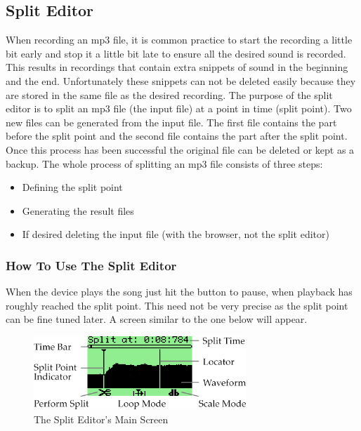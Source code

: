 \subsection{Split Editor}

When recording an mp3 file, it is common practice to start the recording
a little bit early and stop it a little bit late to ensure all the
desired sound is recorded. This results in recordings that contain
extra snippets of sound in the beginning and the end. Unfortunately these
snippets can not be deleted easily because they are stored in the same
file as the desired recording. The purpose of the split editor is to
split an mp3 file (the input file) at a point in time (split point). Two
new files can be generated from the input file. The first file contains
the part before the split point and the second file contains the part
after the split point. Once this process has been successful the
original file can be deleted or kept as a backup. %
%
The whole process of splitting an mp3 file consists of three steps:
%
\begin{itemize}
  \item Defining the split point
  \item Generating the result files
  \item If desired deleting the input file (with the browser, not the split editor)
\end{itemize}

\subsubsection{How To Use The Split Editor}
  When the device plays the song just hit the \ActionWpsPlay{} button
  to pause, when playback has roughly reached the split point. This need
  not be very precise as the split point can be fine tuned later. A screen
  similar to the one below will appear.

  \begin{figure}[H]
    \begin{center}
      \includegraphics[width=8.0cm]{plugins/images/ss-splitedit-main-112x64x1}
      \caption{The Split Editor's Main Screen}
    \end{center}
  \end{figure}

